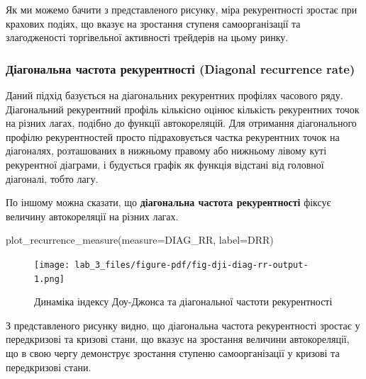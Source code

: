 \documentclass[
  letterpaper,
]{report}
\newenvironment{Shaded}{\begin{snugshade}}{\end{snugshade}}
\newcommand{\NormalTok}[1]{\textcolor[rgb]{0.00,0.23,0.31}{#1}}
\newcommand{\OperatorTok}[1]{\textcolor[rgb]{0.37,0.37,0.37}{#1}}
\newcommand{\StringTok}[1]{\textcolor[rgb]{0.13,0.47,0.30}{#1}}
\begin{document}
Як ми можемо бачити з представленого рисунку, міра рекурентності зростає
при крахових подіях, що вказує на зростання ступеня самоорганізації та
злагодженості торгівельної активності трейдерів на цьому ринку.

\hypertarget{ux434ux456ux430ux433ux43eux43dux430ux43bux44cux43dux430-ux447ux430ux441ux442ux43eux442ux430-ux440ux435ux43aux443ux440ux435ux43dux442ux43dux43eux441ux442ux456-diagonal-recurrence-rate}{%
\subsubsection{Діагональна частота рекурентності (Diagonal recurrence
rate)}\label{ux434ux456ux430ux433ux43eux43dux430ux43bux44cux43dux430-ux447ux430ux441ux442ux43eux442ux430-ux440ux435ux43aux443ux440ux435ux43dux442ux43dux43eux441ux442ux456-diagonal-recurrence-rate}}

Даний підхід базується на діагональних рекурентних профілях часового
ряду. Діагональний рекурентний профіль кількісно оцінює кількість
рекурентних точок на різних лагах, подібно до функції автокореляцій. Для
отримання діагонального профілю рекурентностей просто підраховується
частка рекурентних точок на діагоналях, розташованих в нижньому правому
або нижньому лівому куті рекурентної діаграми, і будується графік як
функція відстані від головної діагоналі, тобто лагу.

По іншому можна сказати, що \textbf{діагональна частота рекурентності}
фіксує величину автокореляції на різних лагах.

\begin{Shaded}
\begin{Highlighting}[]
\NormalTok{plot\_recurrence\_measure(measure}\OperatorTok{=}\NormalTok{DIAG\_RR, label}\OperatorTok{=}\StringTok{\textquotesingle{}DRR\textquotesingle{}}\NormalTok{)}
\end{Highlighting}
\end{Shaded}

\begin{figure}[H]

{\centering \texttt{[image: lab\_3\_files/figure-pdf/fig-dji-diag-rr-output-1.png]}

}

\caption{\label{fig-dji-diag-rr}Динаміка індексу Доу-Джонса та
діагональної частоти рекурентності}

\end{figure}

З представленого рисунку видно, що діагональна частота рекурентності
зростає у передкризові та кризові стани, що вказує на зростання величини
автокореляції, що в свою чергу демонструє зростання ступеню
самоорганізації у кризові та передкризові стани.
\end{document}
